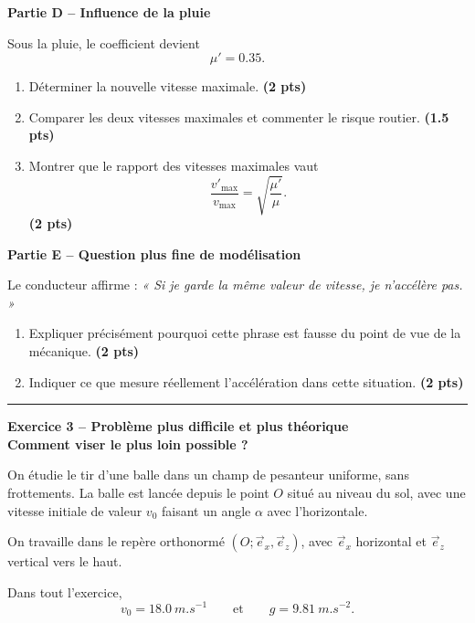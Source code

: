 \documentclass[11pt,a4paper]{article}
\newcommand{\e}[1]{\vec{e}_{#1}}
\newcommand{\bareme}[1]{\hfill{\color{blue!70!black}\textbf{(#1 pts)}}}
\begin{document}
\medskip

\textbf{Partie D -- Influence de la pluie}

Sous la pluie, le coefficient devient
\[
\mu'=0.35.
\]

\begin{enumerate}[label=\textbf{D.\arabic*.}, leftmargin=0.9cm]
    \item Déterminer la nouvelle vitesse maximale. \bareme{2}
    \item Comparer les deux vitesses maximales et commenter le risque routier. \bareme{1.5}
    \item Montrer que le rapport des vitesses maximales vaut
    \[
    \frac{v'_{\max}}{v_{\max}}=\sqrt{\frac{\mu'}{\mu}}.
    \]
    \bareme{2}
\end{enumerate}

\medskip

\textbf{Partie E -- Question plus fine de modélisation}

Le conducteur affirme : \emph{« Si je garde la même valeur de vitesse, je n’accélère pas. »}

\begin{enumerate}[label=\textbf{E.\arabic*.}, leftmargin=0.9cm]
    \item Expliquer précisément pourquoi cette phrase est fausse du point de vue de la mécanique. \bareme{2}
    \item Indiquer ce que mesure réellement l’accélération dans cette situation. \bareme{2}
\end{enumerate}

\vspace{0.4cm}
\hrule
\vspace{0.4cm}

\begin{center}
\textbf{\large Exercice 3 -- Problème plus difficile et plus théorique}\\
\textbf{Comment viser le plus loin possible ?}
\end{center}

On étudie le tir d’une balle dans un champ de pesanteur uniforme, sans frottements. La balle est lancée depuis le point $O$ situé au niveau du sol, avec une vitesse initiale de valeur $v_0$ faisant un angle $\alpha$ avec l’horizontale.

On travaille dans le repère orthonormé $(O;\e{x},\e{z})$, avec $\e{x}$ horizontal et $\e{z}$ vertical vers le haut.

Dans tout l’exercice,
\[
v_0=\SI{18.0}{m.s^{-1}}
\qquad \text{et} \qquad
g=\SI{9.81}{m.s^{-2}}.
\]
\end{document}
